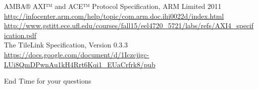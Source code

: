 \documentclass[]{beamer} %
\begin{document}
\begin{thebibliography}{9}
		AMBA® AXI™ and ACE™ Protocol Specification, ARM Limited 2011\\
		\url{http://infocenter.arm.com/help/topic/com.arm.doc.ihi0022d/index.html}\\
		\url{http://www.gstitt.ece.ufl.edu/courses/fall15/eel4720_5721/labs/refs/AXI4_specification.pdf}\\


		The TileLink Specification, Version 0.3.3\\
		\url{https://docs.google.com/document/d/1Iczcjigc-LUi8QmDPwnAu1kH4Rrt6Kqi1_EUaCrfrk8/pub}\\
\end{thebibliography}


\begin{frame}{\Huge End}
	\huge Time for your questions
\end{frame}
\end{document}
